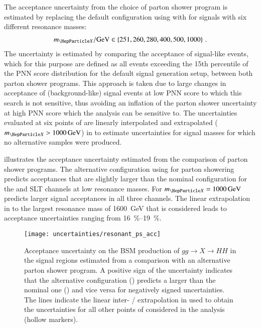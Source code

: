 The acceptance uncertainty from the choice of parton shower program is
estimated by replacing the default configuration using \HERWIG[7.1.3]
with \PYTHIA[8.235] for signals with six different resonance masses:
\begin{align*}
  \mX / \si{\GeV} \in \left\{ 251, 260, 280, 400, 500, 1000
  \right\} \,\text{.}
\end{align*}
The uncertainty is estimated by comparing the acceptance of
signal-like events, which for this purpose are defined as all events
exceeding the 15th percentile of the PNN score distribution for the
default signal generation setup, between both parton shower
programs. This approach is taken due to large changes in acceptance of
(background-like) signal events at low PNN score to which this search
is not sensitive, thus avoiding an inflation of the parton shower
uncertainty at high PNN score which the analysis can be sensitive
to. The uncertainties evaluated at six points of \mX are linearly
interpolated and extrapolated ($\mX > \SI{1000}{\GeV}$) in \mX to
estimate uncertainties for signal masses for which no alternative
samples were produced.

 illustrates the acceptance
uncertainty estimated from the comparison of parton shower
programs. The alternative configuration using \PYTHIA for parton
showering predicts acceptances that are slightly larger than the
nominal configuration for the \hadhad and \lephad SLT channels at low
resonance masses. For $\mX = \SI{1000}{\GeV}$ \HERWIG predicts larger
signal acceptances in all three channels. The linear extrapolation in
\mX to the largest resonance mass of \SI{1600}{\GeV} that is
considered leads to acceptance uncertainties ranging from
\SIrange{16}{19}{\percent}.


%   


\begin{figure}[htbp]
  \centering

  \texttt{[image: uncertainties/resonant\_ps\_acc]}

  \caption{Acceptance uncertainty on the BSM production of
    $gg \to X \to HH$ in the signal regions estimated from a
    comparison with an alternative parton shower program. A positive
    sign of the uncertainty indicates that the alternative
    configuration (\PYTHIA) predicts a larger \AccTimesEff than the
    nominal one (\HERWIG) and vice versa for negatively signed
    uncertainties. The lines indicate the linear inter- /
    extrapolation in \mX used to obtain the uncertainties for all
    other points of \mX considered in the analysis (hollow markers).}
  \label{fig:resonant_partonshower}
\end{figure}

